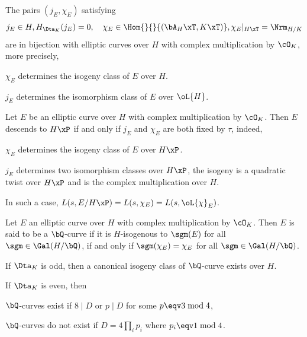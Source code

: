 \documentclass[a4paper, twoside]{article}
\begin{document}
\begin{thm}
	The pairs $(j_{E},\chi_{E})$ satisfying
	\[
		j_{E}\in H, H_{\Dta_{K}}(j_{E})=0,\quad \chi_{E}\in\Hom{}{}{(\bA_{H}\xT,K\xT)}, \chi_{E}|_{H\xT}=\Nrm_{H/K}
	\]
	are in bijection with elliptic curves over $H$ with complex multiplication by $\cO_{K}$, more precisely,
	\begin{itm}
		\item $\chi_{E}$ determines the isogeny class of $E$ over $H$.
		\item $j_{E}$ determines the isomorphism class of $E$ over $\oL{H}$.
	\end{itm}
\end{thm}

\begin{thm}
	Let $E$ be an elliptic curve over $H$ with complex multiplication by $\cO_{K}$. Then $E$ descends to $H\xP$ if and only if $j_{E}$ and $\chi_{E}$ are both fixed by $\tau$, indeed,
	\begin{itm}
		\item $\chi_{E}$ determines the isogeny class of $E$ over $H\xP$.
		\item $j_{E}$ determines two isomorphism classes over $H\xP$, the isogeny is a quadratic twist over $H\xP$ and is the complex multiplication over $H$.
	\end{itm}
	In such a case, $L(s,E/H\xP)=L(s,\chi_{E})=L(s,\oL{\chi}_{E})$.
\end{thm}

\begin{thm}
	Let $E$ an elliptic curve over $H$ with complex multiplication by $\cO_{K}$. Then $E$ is said to be a $\bQ$-curve if it is $H$-isogenous to $\sgm(E)$ for all $\sgm\in\Gal(H/\bQ)$, if and only if $\sgm(\chi_{E})=\chi_{E}$ for all $\sgm\in\Gal(H/\bQ)$.
	\begin{itm}
		\item If $\Dta_{K}$ is odd, then a canonical isogeny class of $\bQ$-curve exists over $H$.
		\item If $\Dta_{K}$ is even, then
		\begin{itm}
			\item $\bQ$-curves exist if $8\mid D$ or $p\mid D$ for some $p\eqv3\bmod{4}$,
			\item $\bQ$-curves do not exist if $D=4\prod_{i}p_{i}$ where $p_{i}\eqv1\bmod{4}$.
		\end{itm}
	\end{itm}
\end{thm}
\end{document}
